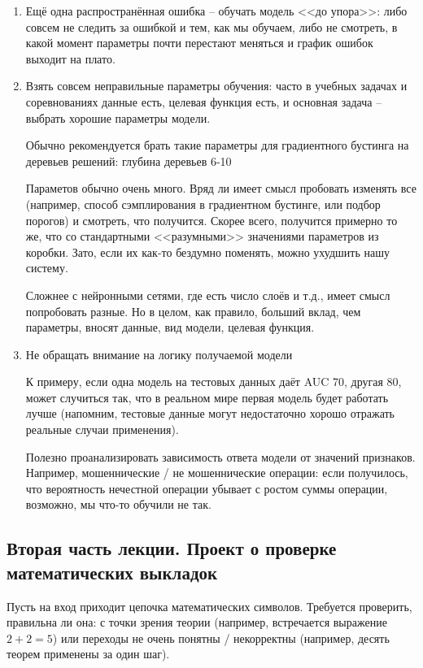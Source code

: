 \documentclass[main.tex]{subfiles}
\begin{document}
\begin{enumerate}[noitemsep]
	\item Ещё одна распространённая ошибка -- обучать модель <<до упора>>: либо совсем не следить за ошибкой и тем, как мы обучаем, либо не смотреть, в какой момент параметры почти перестают меняться и график ошибок выходит на плато.
	\item Взять совсем неправильные параметры обучения: часто в учебных задачах и соревнованиях данные есть, целевая функция есть, и основная задача -- выбрать хорошие параметры модели.
	
	Обычно рекомендуется брать такие параметры для градиентного бустинга на деревьев решений: глубина деревьев 6-10
	
	Параметов обычно очень много.
	Вряд ли имеет смысл пробовать изменять все (например, способ сэмплирования в градиентном бустинге, или подбор порогов) и смотреть, что получится.
	Скорее всего, получится примерно то же, что со стандартными <<разумными>> значениями параметров из коробки.
	Зато, если их как-то бездумно поменять, можно ухудшить нашу систему.
	
	Сложнее с нейронными сетями, где есть число слоёв и т.д., имеет смысл попробовать разные.
	Но в целом, как правило, больший вклад, чем параметры, вносят данные, вид модели, целевая функция.
	
	\item Не обращать внимание на логику получаемой модели
	
	К примеру, если одна модель на тестовых данных даёт AUC 70, другая 80, может случиться так, что в реальном мире первая модель будет работать лучше (напомним, тестовые данные могут недостаточно хорошо отражать реальные случаи применения).
	
	Полезно проанализировать зависимость ответа модели от значений признаков. Например, мошеннические / не мошеннические операции: если получилось, что вероятность нечестной операции убывает с ростом суммы операции, возможно, мы что-то обучили не так.
	
\end{enumerate}

\subsection{ Вторая часть лекции. Проект о проверке математических выкладок }

Пусть на вход приходит цепочка математических символов.
Требуется проверить, правильна ли она: с точки зрения теории (например, встречается выражение $ 2 + 2 = 5 $) или переходы не очень понятны / некорректны (например, десять теорем применены за один шаг).
\end{document}
